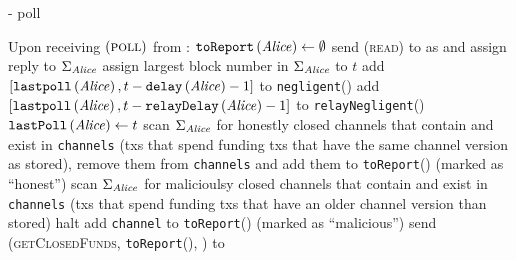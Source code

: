\begin{systembox}{\fpaynet - poll}
  \label{alg:fpaynet:poll}
  \begin{algorithmic}[1]
    \State Upon receiving $\left(\textsc{poll}\right)$ from \alice:
    \Indent
      \State $\mathtt{toReport}\left(\mathit{Alice}\right) \gets \emptyset$
      \State send (\textsc{read}) to \ledger{} as \alice{} and assign reply to
      $\Sigma_{\mathit{Alice}}$
      \State assign largest block number in $\Sigma_{\mathit{Alice}}$ to $t$
        \State add $\left[\mathtt{lastpoll}\left(\mathit{Alice}\right), t -
        \texttt{delay}\left(\mathit{Alice}\right) - 1\right]$ to
        \texttt{negligent}(\alice)
      \EndIf
        \State add $\left[\mathtt{lastpoll}\left(\mathit{Alice}\right), t -
        \texttt{relayDelay}\left(\mathit{Alice}\right) - 1\right]$ to
        \texttt{relayNegligent}(\alice)
      \EndIf
      \State $\mathtt{lastPoll}\left(\mathit{Alice}\right) \gets t$
      \State scan $\Sigma_{\mathit{Alice}}$ for honestly closed channels that contain
      \alice{} and exist in \texttt{channels} (txs that spend funding txs that
      have the same channel version as stored), remove them from
      \texttt{channels} and add them to \texttt{toReport}(\alice) (marked as
      ``honest'')
      \State scan $\Sigma_{\mathit{Alice}}$ for malicioulsy closed channels that contain
      \alice{} and exist in \texttt{channels} (txs that spend funding txs that
      have an older channel version than stored)
       
          \State halt
        \EndIf
        \State add \texttt{channel} to \texttt{toReport}(\alice) (marked as
        ``malicious'')
      \EndFor
      \State send (\textsc{getClosedFunds}, \texttt{toReport}(\alice), \alice)
      to \simulator
    \EndIndent
    \State


\end{algorithmic}
\end{systembox}
